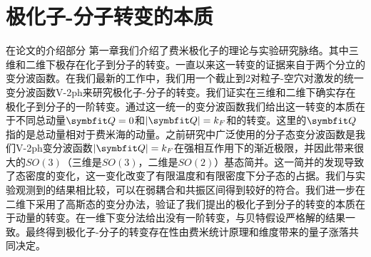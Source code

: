 \chapter{极化子-分子转变的本质}\label{chap2polaron}

在论文的介绍部分{\color {red} 第一章}我们介绍了费米极化子的理论与实验研究脉络。其中三维和二维下极存在化子到分子的转变。一直以来这一转变的证据来自于两个分立的变分波函数。在我们最新的工作中，我们用一个截止到2对粒子-空穴对激发的统一变分波函数V-2ph来研究极化子-分子的转变。我们证实在三维和二维下确实存在极化子到分子的一阶转变。通过这一统一的变分波函数我们给出这一转变的本质在于不同总动量$\Vector{Q}=0$和$|\Vector{Q}|=k_F$和的转变。这里的$\Vector{Q}$指的是总动量相对于费米海的动量。之前研究中广泛使用的分子态变分波函数是我们V-2ph变分波函数$|\Vector{Q}|=k_F$在强相互作用下的渐近极限，并因此带来很大的$SO(3)$（三维是$SO(3)$，二维是$SO(2)$）基态简并。这一简并的发现导致了态密度的变化，这一变化改变了有限温度和有限密度下分子态的占据。我们与实验观测到的结果相比较，可以在弱耦合和共振区间得到较好的符合。我们进一步在二维下采用了高斯态的变分办法，验证了我们提出的极化子到分子的转变的本质在于动量的转变。在一维下变分法给出没有一阶转变，与贝特假设严格解的结果一致。最终得到极化子-分子的转变存在性由费米统计原理和维度带来的量子涨落共同决定。

